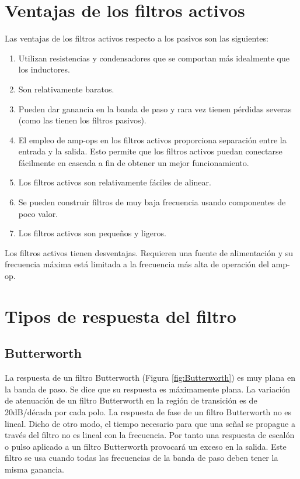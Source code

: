 \section{Ventajas de los filtros activos}
Las ventajas de los filtros activos respecto a los pasivos son las siguientes:
\begin{enumerate}
    \item Utilizan resistencias y condensadores que se comportan más idealmente que los inductores.
    \item Son relativamente baratos.
    \item Pueden dar ganancia en la banda de paso y rara vez tienen pérdidas severas (como las tienen los filtros pasivos).
    \item El empleo de amp-ops en los filtros activos proporciona separación entre la entrada y la salida. Esto permite que los filtros activos puedan conectarse fácilmente en cascada a fin de obtener un mejor funcionamiento.
    \item Los filtros activos son relativamente fáciles de alinear.
    \item Se pueden construir filtros de muy baja frecuencia usando componentes de poco valor.
    \item Los filtros activos son pequeños y ligeros.
\end{enumerate}

Los filtros activos tienen desventajas. Requieren una fuente de alimentación y su frecuencia máxima está limitada a la frecuencia más alta de operación del amp-op.

\section{Tipos de respuesta del filtro}
\subsection{Butterworth}
La respuesta de un filtro Butterworth (Figura \ref{fig:Butterworth}) es muy plana en la banda de paso. Se dice que su respuesta es máximamente plana. La variación de atenuación de un filtro Butterworth en la región de transición es de 20dB/década por cada polo. La respuesta de fase de un filtro Butterworth no es lineal. Dicho de otro modo, el tiempo necesario para que una señal se propague a través del filtro no es lineal con la frecuencia. Por tanto una respuesta de escalón o pulso aplicado a un filtro Butterworth provocará un exceso en la salida. Este filtro se usa cuando todas las frecuencias de la banda de paso deben tener la misma ganancia.

